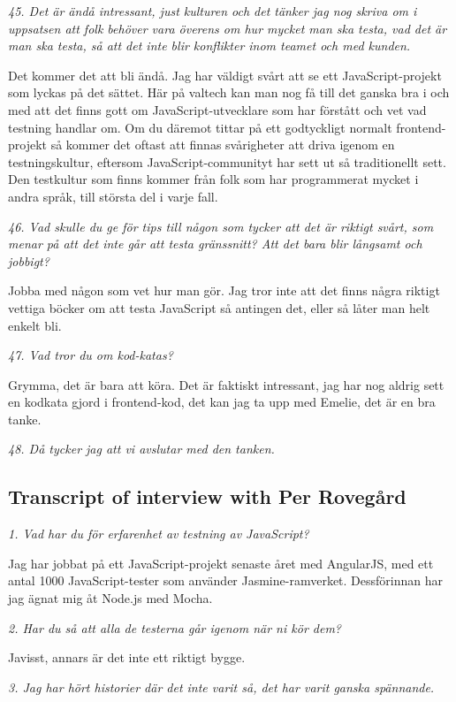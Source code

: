 \documentclass[11pt]{article}
\begin{document}
\emph{45. Det är ändå intressant, just kulturen och det tänker jag nog skriva om i uppsatsen att folk behöver vara överens om hur mycket man ska testa, vad det är man ska testa, så att det inte blir konflikter inom teamet och med kunden.}

Det kommer det att bli ändå. Jag har väldigt svårt att se ett JavaScript-projekt som lyckas på det sättet. Här på valtech kan man nog få till det ganska bra i och med att det finns gott om JavaScript-utvecklare som har förstått och vet vad testning handlar om. Om du däremot tittar på ett godtyckligt normalt frontend-projekt så kommer det oftast att finnas svårigheter att driva igenom en testningskultur, eftersom JavaScript-communityt har sett ut så traditionellt sett. Den testkultur som finns kommer från folk som har programmerat mycket i andra språk, till största del i varje fall.

\emph{46. Vad skulle du ge för tips till någon som tycker att det är riktigt svårt, som menar på att det inte går att testa gränssnitt? Att det bara blir långsamt och jobbigt?}

Jobba med någon som vet hur man gör. Jag tror inte att det finns några riktigt vettiga böcker om att testa JavaScript så antingen det, eller så låter man helt enkelt bli.

\emph{47. Vad tror du om kod-katas?}

Grymma, det är bara att köra. Det är faktiskt intressant, jag har nog aldrig sett en kodkata gjord i frontend-kod, det kan jag ta upp med Emelie, det är en bra tanke.

\emph{48. Då tycker jag att vi avslutar med den tanken.}


\subsection{Transcript of interview with Per Rovegård}

\emph{1. Vad har du för erfarenhet av testning av JavaScript?}

Jag har jobbat på ett JavaScript-projekt senaste året med AngularJS, med ett antal 1000 JavaScript-tester som använder Jasmine-ramverket. Dessförinnan har jag ägnat mig åt Node.js med Mocha.

\emph{2. Har du så att alla de testerna går igenom när ni kör dem?}

Javisst, annars är det inte ett riktigt bygge.

\emph{3. Jag har hört historier där det inte varit så, det har varit ganska spännande.}
\end{document}
